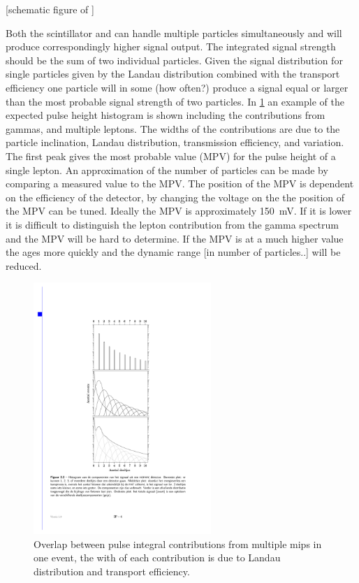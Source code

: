 [schematic figure of \pmt]

Both the scintillator and \pmt can handle multiple particles simultaneously and will produce correspondingly higher signal output. The integrated signal strength should be the sum of two individual particles. Given the signal distribution for single particles given by the Landau distribution combined with the transport efficiency one particle will in some (how often?) produce a signal equal or larger than the most probable signal strength of two particles. In \cref{fig:ph_histogram_contrib} an example of the expected pulse height histogram is shown including the contributions from gammas, and multiple leptons. The widths of the contributions are due to the particle inclination, Landau distribution, transmission efficiency, and \pmt variation. The first peak gives the most probable value (MPV) for the pulse height of a single lepton. An approximation of the number of particles can be made by comparing a measured value to the MPV. The position of the MPV is dependent on the efficiency of the detector, by changing the voltage on the \pmt the position of the MPV can be tuned. Ideally the MPV is approximately \SI{150}{\mV}. If it is lower it is difficult to distinguish the lepton contribution from the gamma spectrum and the MPV will be hard to determine. If the MPV is at a much higher value the \pmt ages more quickly and the dynamic range [in number of particles..] will be reduced.

\begin{figure}
    \centering
    \includegraphics[width=0.6\textwidth]
                    {plots/experiment/ph_histogram_contrib}
    \caption{Overlap between pulse integral contributions from multiple mips in one event, the with of each contribution is due to Landau distribution and transport efficiency.}
    \label{fig:ph_histogram_contrib}
\end{figure}

